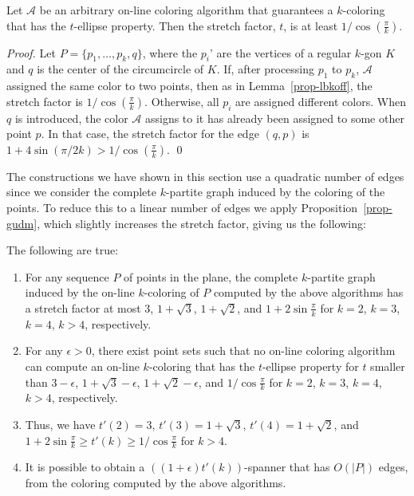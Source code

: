 \documentclass[pdftex,leqno,fleqn,12pts]{llncs}
\begin{document}
\begin{lemma} 
Let $\mathcal{A}$ be an arbitrary on-line coloring algorithm that 
guarantees a $k$-coloring that has the $t$-ellipse property. Then the stretch factor, $t$, is at 
least $1/\cos(\frac{\pi}{ k})$.
\end{lemma}
\begin{proof} 
Let $P=\{p_1,\ldots,p_{k},q\}$, where the $p_i$' are the vertices of
a regular $k$-gon $K$ and $q$ is the center of the circumcircle of
$K$. If, after processing $p_1$ to $p_k$, $\mathcal{A}$ assigned the
same color to two points, then as in Lemma~\ref{prop-lbkoff},
the stretch factor is $1/ \cos(\frac{\pi}{ k})$. Otherwise, all $p_i$ are
assigned different colors. When $q$ is introduced, the color
$\mathcal{A}$ assigns to it has already been assigned to some other
point $p$. In that case, the stretch factor for the edge $(q,p)$ is
$1+4\sin(\pi/ 2k)>1/ \cos(\frac{\pi}{k})$.
\qed 
\end{proof}



The constructions we have shown in this section use a quadratic number of edges since we 
consider the complete $k$-partite graph induced by the coloring of the points. 
To reduce this to a linear number of edges we apply Proposition~\ref{prop-gudm}, 
which slightly increases the stretch factor, giving us the following:




\begin{theorem}
The following are true:
\begin{enumerate}
\item
For any sequence $P$ of points in the plane, the complete $k$-partite graph 
induced by the on-line $k$-coloring of $P$ computed by the above algorithms 
has a stretch factor at most
$3$, $1+ \sqrt{3}$, $1+ \sqrt{2}$, and 
$1+ 2 \sin\frac{\pi}{k}$ for $k=2$, $k=3$, $k=4$, $k>4$, respectively. 


\item
For any $\epsilon>0$, there exist point sets such that no on-line coloring algorithm can 
compute an on-line $k$-coloring that has the $t$-ellipse property for $t$ smaller than
$3-\epsilon$, $1+ \sqrt{3}-\epsilon$, $1+ \sqrt{2}-\epsilon$, and 
$1/ \cos \frac{\pi}{k} $ 
for $k=2$, $k=3$, $k=4$, $k>4$, respectively.


\item
Thus, we have
$t'(2)= 3$, $t'(3)= 1+ \sqrt{3}$, $t'(4) = 1+ \sqrt{2}$, and 
$ 1+ 2 \sin\frac{\pi}{k}  \geq t'(k) \geq 1/ \cos \frac{\pi}{k}$ for $k > 4$.

\item
It is possible to obtain a $((1+\epsilon)t'(k))$-spanner that has $O(|P|)$ edges, from 
the coloring computed by the above algorithms.

\end{enumerate}
\end{theorem}
\end{document}
